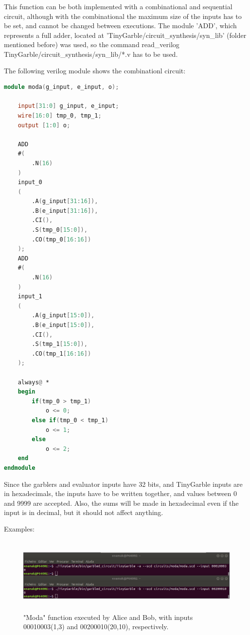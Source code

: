 \begin{refsection}
This function can be both implemented with a combinational and sequential circuit, although with the combinational the maximum size of the inputs has to be set, and cannot be changed between executions.
The module 'ADD', which represents a full adder, located at 'TinyGarble/circuit\_synthesis/syn\_lib' (folder mentioned before) was used, so the command read\_verilog TinyGarble/circuit\_synthesis/syn\_lib/*.v has to be used.

The following verilog module shows the combinationl circuit:

\newpage

\begin{lstlisting}[caption={moda.v}, language=Verilog, captionpos=b]
module moda(g_input, e_input, o);

	input[31:0] g_input, e_input;
	wire[16:0] tmp_0, tmp_1;
	output [1:0] o;

	ADD 
	#(
		.N(16)
	)
	input_0
	(
		.A(g_input[31:16]),
		.B(e_input[31:16]),
		.CI(),
		.S(tmp_0[15:0]),
		.CO(tmp_0[16:16])
	);
	ADD 
	#(
		.N(16)
	)
	input_1
	(
		.A(g_input[15:0]),
		.B(e_input[15:0]),
		.CI(),
		.S(tmp_1[15:0]),
		.CO(tmp_1[16:16])
	);	

	always@ *
	begin
		if(tmp_0 > tmp_1)
			o <= 0;
		else if(tmp_0 < tmp_1)
			o <= 1;
		else
			o <= 2;
	end
endmodule
\end{lstlisting}

\newpage
Since the garblers and evaluator inputs have 32 bits, and TinyGarble inputs are in hexadecimals, the inputs have to be written together, and values between 0 and 9999 are accepted. Also, the sums will be made in hexadecimal even if the input is in decimal, but it should not affect anything.

Examples:

\begin{figure}[H]
	\centering
	\includegraphics[width=1\textwidth, height=3.8cm]{./sdf/tiny_garble/figures/tinygarble_moda_0.png}
    \caption{"Moda" function executed by Alice and Bob, with inputs 00010003(1,3) and 00200010(20,10), respectively.}\label{fig:tinygarble_moda_0}
\end{figure}


\end{refsection}
